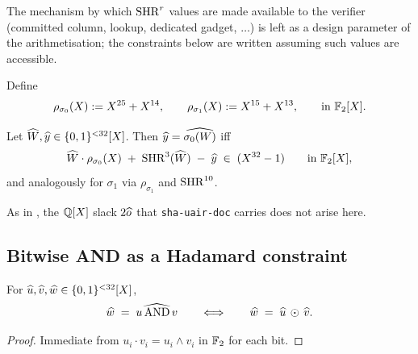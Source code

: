 The mechanism by which $\operatorname{SHR}^r$ values are made available to the
verifier (committed column, lookup, dedicated gadget, $\dots$) is left
as a design parameter of the arithmetisation; the constraints below
are written assuming such values are accessible.

Define
\begin{equation}\label{eq:rho-sigma}
\rho_{\sigma_0}(X) := X^{25} + X^{14}, \qquad
\rho_{\sigma_1}(X) := X^{15} + X^{13}, \qquad \text{in } \mathbb{F}_2[X].
\end{equation}

\begin{lemma}\label{lem:small-sigma}
Let $\widehat{W}, \widehat{y} \in \{0,1\}^{<32}[X]$. Then $\widehat{y} = \widehat{\sigma_0(W)}$
iff
\begin{equation}\label{eq:lsig0}
\widehat{W} \cdot \rho_{\sigma_0}(X) \;+\; \operatorname{SHR}^{3}(\widehat{W}) \;-\; \widehat{y} \;\in\; (X^{32}-1)
\qquad \text{in } \mathbb{F}_2[X],
\end{equation}
and analogously for $\sigma_1$ via $\rho_{\sigma_1}$ and $\operatorname{SHR}^{10}$.
\end{lemma}

As in , the $\mathbb{Q}[X]$ slack $2\widehat{o}$ that
\texttt{sha-uair-doc} carries does not arise here.

\subsection{Bitwise AND as a Hadamard constraint}\label{sec:and-hadamard}

\begin{lemma}\label{lem:and}
For $\widehat{u}, \widehat{v}, \widehat{w} \in \{0,1\}^{<32}[X]$,
$$
\widehat{w} \;=\; \widehat{u \operatorname{AND} v} \qquad \Longleftrightarrow \qquad
\widehat{w} \;=\; \widehat{u}\, \odot\, \widehat{v}.
$$
\end{lemma}

\begin{proof}
Immediate from $u_i \cdot v_i = u_i \wedge v_i$ in $\mathbb{F}_2$ for each bit.
\end{proof}

